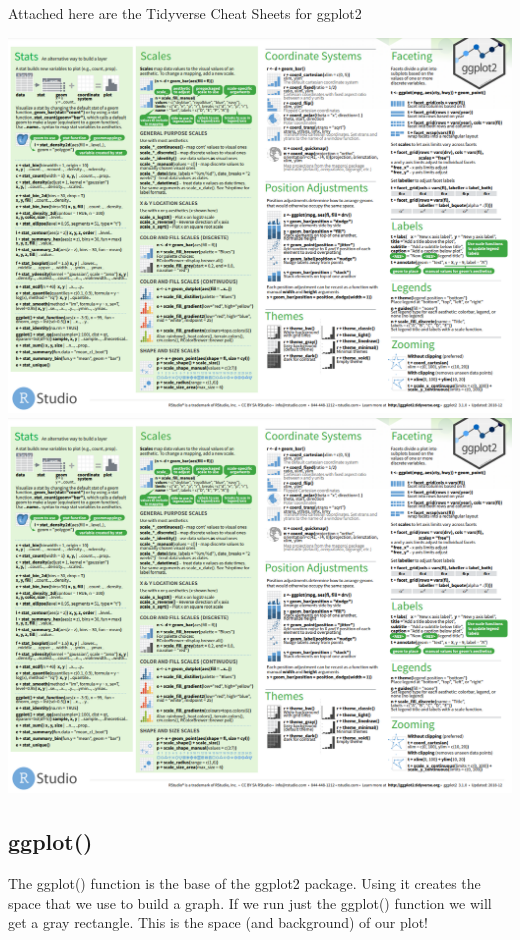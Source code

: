 \documentclass[
  letterpaper,
  DIV=11,
  numbers=noendperiod]{scrartcl}
\begin{document}
Attached here are the Tidyverse Cheat Sheets for ggplot2

\includegraphics{images/ggplot cheat sheet 2.png}\\

\includegraphics{images/ggplot cheat sheet 2.png}\\

\subsection{\texorpdfstring{\textbf{ggplot()}}{ggplot()}}

The ggplot() function is the base of the ggplot2 package. Using it
creates the space that we use to build a graph. If we run just the
ggplot() function we will get a gray rectangle. This is the space (and
background) of our plot!
\end{document}
